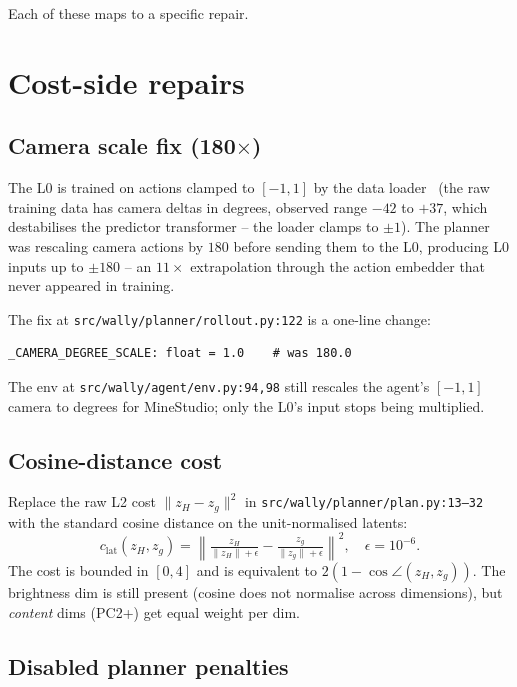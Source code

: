 \documentclass[11pt]{article}
\begin{document}
Each of these maps to a specific repair.

\section{Cost-side repairs}
\label{sec:repairs}

\subsection{Camera scale fix (180$\times$)}

The L0 is trained on actions clamped to $[-1, 1]$ by the data
loader~\cite{wally:ag} (the raw training data has camera deltas
in degrees, observed range $-42$ to $+37$, which destabilises the
predictor transformer -- the loader clamps to $\pm 1$). The
planner was rescaling camera actions by $180$ before sending
them to the L0, producing L0 inputs up to $\pm 180$ -- an
$11\times$ extrapolation through the action embedder that never
appeared in training.

The fix at \texttt{src/wally/planner/rollout.py:122} is a one-line
change:
\begin{verbatim}
_CAMERA_DEGREE_SCALE: float = 1.0    # was 180.0
\end{verbatim}
The env at \texttt{src/wally/agent/env.py:94,98} still rescales
the agent's $[-1, 1]$ camera to degrees for MineStudio; only the
L0's input stops being multiplied.

\subsection{Cosine-distance cost}

Replace the raw L2 cost
$\|z_H - z_g\|^2$ in
\texttt{src/wally/planner/plan.py:13--32} with the standard cosine
distance on the unit-normalised latents:
\begin{equation}
c_{\mathrm{lat}}(z_H, z_g) = \left\|
  \tfrac{z_H}{\|z_H\| + \epsilon}
  - \tfrac{z_g}{\|z_g\| + \epsilon}
\right\|^2,\quad \epsilon = 10^{-6}.
\label{eq:cosine}
\end{equation}
The cost is bounded in $[0, 4]$ and is equivalent to
$2(1 - \cos\angle(z_H, z_g))$. The brightness dim is still
present (cosine does not normalise across dimensions), but
\emph{content} dims (PC2+) get equal weight per dim.

\subsection{Disabled planner penalties}
\end{document}
